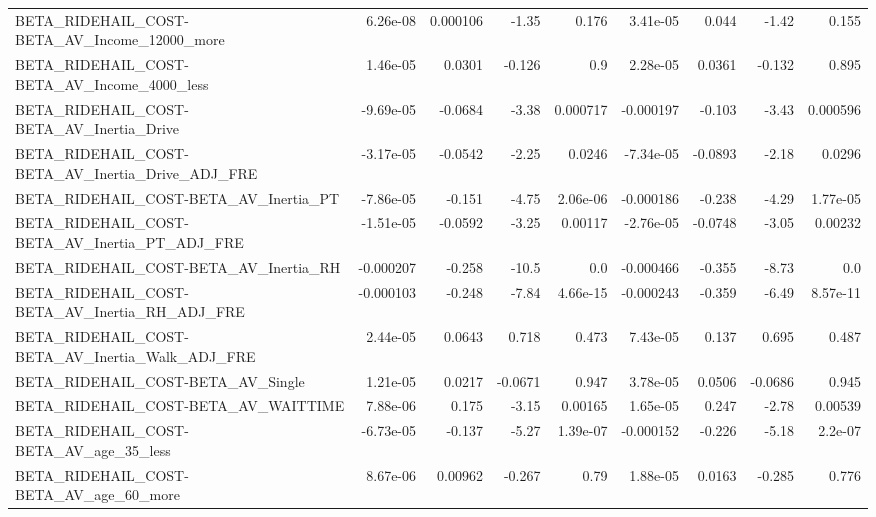 \begin{tabular}{lrrrrrrrr}
BETA\_RIDEHAIL\_COST-BETA\_AV\_Income\_12000\_more       &    6.26e-08 &     0.000106 &    -1.35 &    0.176 &   3.41e-05 &       0.044 &        -1.42 &         0.155 \\
BETA\_RIDEHAIL\_COST-BETA\_AV\_Income\_4000\_less        &    1.46e-05 &       0.0301 &   -0.126 &      0.9 &   2.28e-05 &      0.0361 &       -0.132 &         0.895 \\
BETA\_RIDEHAIL\_COST-BETA\_AV\_Inertia\_Drive           &   -9.69e-05 &      -0.0684 &    -3.38 & 0.000717 &  -0.000197 &      -0.103 &        -3.43 &      0.000596 \\
BETA\_RIDEHAIL\_COST-BETA\_AV\_Inertia\_Drive\_ADJ\_FRE   &   -3.17e-05 &      -0.0542 &    -2.25 &   0.0246 &  -7.34e-05 &     -0.0893 &        -2.18 &        0.0296 \\
BETA\_RIDEHAIL\_COST-BETA\_AV\_Inertia\_PT              &   -7.86e-05 &       -0.151 &    -4.75 & 2.06e-06 &  -0.000186 &      -0.238 &        -4.29 &      1.77e-05 \\
BETA\_RIDEHAIL\_COST-BETA\_AV\_Inertia\_PT\_ADJ\_FRE      &   -1.51e-05 &      -0.0592 &    -3.25 &  0.00117 &  -2.76e-05 &     -0.0748 &        -3.05 &       0.00232 \\
BETA\_RIDEHAIL\_COST-BETA\_AV\_Inertia\_RH              &   -0.000207 &       -0.258 &    -10.5 &      0.0 &  -0.000466 &      -0.355 &        -8.73 &           0.0 \\
BETA\_RIDEHAIL\_COST-BETA\_AV\_Inertia\_RH\_ADJ\_FRE      &   -0.000103 &       -0.248 &    -7.84 & 4.66e-15 &  -0.000243 &      -0.359 &        -6.49 &      8.57e-11 \\
BETA\_RIDEHAIL\_COST-BETA\_AV\_Inertia\_Walk\_ADJ\_FRE    &    2.44e-05 &       0.0643 &    0.718 &    0.473 &   7.43e-05 &       0.137 &        0.695 &         0.487 \\
BETA\_RIDEHAIL\_COST-BETA\_AV\_Single                  &    1.21e-05 &       0.0217 &  -0.0671 &    0.947 &   3.78e-05 &      0.0506 &      -0.0686 &         0.945 \\
BETA\_RIDEHAIL\_COST-BETA\_AV\_WAITTIME                &    7.88e-06 &        0.175 &    -3.15 &  0.00165 &   1.65e-05 &       0.247 &        -2.78 &       0.00539 \\
BETA\_RIDEHAIL\_COST-BETA\_AV\_age\_35\_less             &   -6.73e-05 &       -0.137 &    -5.27 & 1.39e-07 &  -0.000152 &      -0.226 &        -5.18 &       2.2e-07 \\
BETA\_RIDEHAIL\_COST-BETA\_AV\_age\_60\_more             &    8.67e-06 &      0.00962 &   -0.267 &     0.79 &   1.88e-05 &      0.0163 &       -0.285 &         0.776 \\

\end{tabular}
